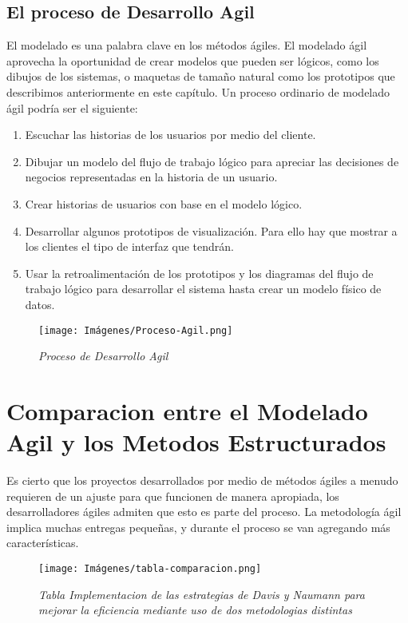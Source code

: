 \subsection{El proceso de Desarrollo Agil}
El modelado es una palabra clave en los métodos ágiles. El modelado ágil aprovecha la oportunidad de crear modelos que pueden ser lógicos, como los dibujos de los sistemas, o maquetas de tamaño natural como los prototipos que describimos anteriormente en este capítulo. Un proceso ordinario de modelado ágil podría ser el  siguiente:
\begin{enumerate}
\item Escuchar las historias de los usuarios por medio del cliente.
\item Dibujar un modelo del flujo de trabajo lógico para apreciar las decisiones de negocios representadas en la historia de un usuario.
\item Crear historias de usuarios con base en el modelo lógico.
\item Desarrollar algunos prototipos de visualización. Para ello hay que mostrar a los clientes el tipo de interfaz que tendrán. 
\item Usar la retroalimentación de los prototipos y los diagramas del flujo de trabajo lógico para desarrollar el sistema hasta crear un modelo físico de datos.
\end{enumerate}

\begin{figure}[h!]
    \centering
    \texttt{[image: Imágenes/Proceso-Agil.png]}
    \caption{\textit{Proceso de Desarrollo Agil}}
    \label{exemploLabel}
    \end{figure}
\section{Comparacion entre el Modelado Agil y los Metodos Estructurados}
Es cierto que los proyectos desarrollados por medio de métodos ágiles a menudo requieren de un ajuste para que funcionen de manera apropiada, los desarrolladores ágiles admiten que esto es parte del proceso. La metodología ágil implica muchas entregas pequeñas, y durante el proceso se van agregando más características.
\begin{figure}[h!]
    \centering
    \texttt{[image: Imágenes/tabla-comparacion.png]}
    \caption{\textit{Tabla Implementacion de las estrategias de Davis y Naumann para mejorar la eficiencia mediante uso de dos metodologias distintas}}
    \label{exemploLabel}
    \end{figure}
